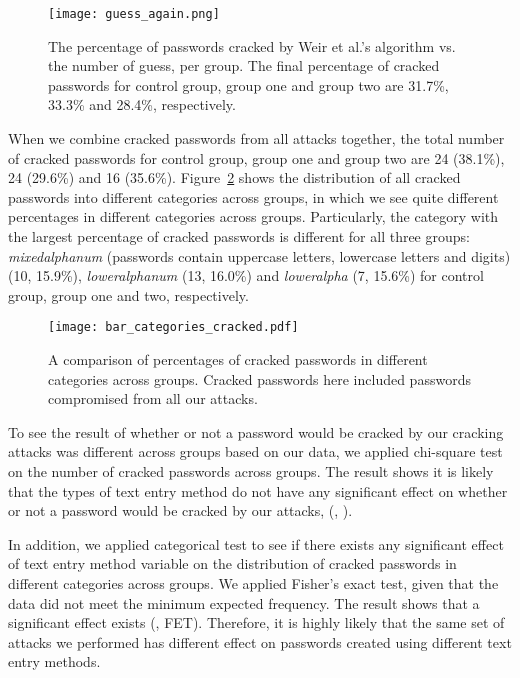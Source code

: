 \documentclass[conference]{IEEEtran}
\begin{document}
\begin{figure}
\texttt{[image: guess\_again.png]}
\caption{\label{fig:guess_again} The percentage of passwords cracked by Weir et al.'s algorithm vs. the number of guess, per group. The final percentage of cracked passwords for control group, group one and group two are 31.7\%, 33.3\% and 28.4\%, respectively.}
\vspace{-9pt}
\end{figure}


When we combine cracked passwords from all attacks together, the total number of cracked passwords for control group, group one and group two are 24 (38.1\%), 24 (29.6\%) and 16 (35.6\%). Figure~\ref{fig:bar_categories_cracked} shows the distribution of all cracked passwords into different categories across groups, in which we see quite different percentages in different categories across groups. Particularly, the category with the largest percentage of cracked passwords is different for all three groups: \emph{mixedalphanum} (passwords contain uppercase letters, lowercase letters and digits) (10, 15.9\%), \emph{loweralphanum} (13, 16.0\%) and \emph{loweralpha} (7, 15.6\%) for control group, group one and two, respectively.


\begin{figure}[tbph]
\texttt{[image: bar\_categories\_cracked.pdf]}
\caption{\label{fig:bar_categories_cracked} A comparison of percentages of cracked passwords in different categories across groups. Cracked passwords here included passwords compromised from all our attacks.}
\vspace{-9pt}
\end{figure}

To see the result of whether or not a password would be cracked by our cracking attacks was different across groups based on our data, we applied chi-square test on the number of cracked passwords across groups. The result shows it is likely that the types of text entry method do not have any significant effect on whether or not a password would be cracked by our attacks, (, ).

In addition, we applied categorical test to see if there exists any significant effect of text entry method variable on the distribution of cracked passwords in different categories across groups. We applied Fisher's exact test, given that the data did not meet the minimum expected frequency. The result shows that a significant effect exists (, FET). Therefore, it is highly likely that the same set of attacks we performed has different effect on passwords created using different text entry methods.
\end{document}
